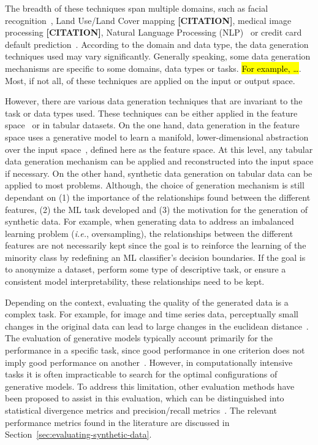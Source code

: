 \documentclass[parskip=full]{scrartcl}
\begin{document}
The breadth of these techniques span multiple domains, such as facial
recognition~\cite{lv2017data}, Land Use/Land Cover mapping
\textbf{[CITATION]}, medical image processing \textbf{[CITATION]}, Natural
Language Processing (NLP)~\cite{feng2021survey} or credit card default
prediction~\cite{alam2020investigation}. According to the domain and data
type, the data generation techniques used may vary significantly. Generally
speaking, some data generation mechanisms are specific to some domains, data
types or tasks. \hl{For example, \ldots}. Most, if not all, of these
techniques are applied on the input or output space.

However, there are various data generation techniques that are invariant to
the task or data types used. These techniques can be either applied in the
feature space~\cite{devries2017dataset} or in tabular datasets. On the one
hand, data generation in the feature space uses a generative model to learn a
manifold, lower-dimensional abstraction over the input
space~\cite{kingma2019introduction}, defined here as the feature space. At
this level, any tabular data generation mechanism can be applied and
reconstructed into the input space if necessary. On the other hand, synthetic
data generation on tabular data can be applied to most problems. Although, the
choice of generation mechanism is still dependant on (1) the importance of the
relationships found between the different features, (2) the ML task developed
and (3) the motivation for the generation of synthetic data. For example, when
generating data to address an imbalanced learning problem (\textit{i.e.},
oversampling), the relationships between the different features are not
necessarily kept since the goal is to reinforce the learning of the minority
class by redefining an ML classifier's decision boundaries. If the goal is to
anonymize a dataset, perform some type of descriptive task, or ensure a
consistent model interpretability, these relationships need to be kept.

Depending on the context, evaluating the quality of the generated data is a
complex task. For example, for image and time series data, perceptually small
changes in the original data can lead to large changes in the euclidean
distance~\cite{assefa2020generating, theis2016note}. The evaluation of
generative models typically account primarily for the performance in a
specific task, since good performance in one criterion does not imply good
performance on another~\cite{theis2016note}. However, in computationally
intensive tasks it is often impracticable to search for the optimal
configurations of generative models. To address this limitation, other
evaluation methods have been proposed to assist in this evaluation, which can
be distinguished into statistical divergence metrics and precision/recall
metrics~\cite{alaa2022faithful}. The relevant performance metrics found in the
literature are discussed in Section~\ref{sec:evaluating-synthetic-data}.
\end{document}
